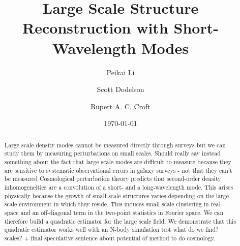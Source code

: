 \documentclass[prd,amsmath,amssymb,floatfix,superscriptaddress,nofootinbib,twocolumn]{revtex4-1}
\newcommand{\RC}[1]{{\color{darkorange} #1}}
\begin{document}
\title{Large Scale Structure Reconstruction with Short-Wavelength Modes}
\author{\large Peikai Li}
\author{\large Scott Dodelson}
\author{\large Rupert A. C. Croft}

\date{\today}
\begin{abstract}
  \noindent Large scale density modes cannot be measured directly through surveys but we can study them by measuring perturbations on small scales.
\RC{ Should really say instead something about  the fact that large scale modes are difficult to measure
    because they are sensitive to systematic observational  errors in
    galaxy surveys - not that they can't be measured}
  Cosmological perturbation theory predicts that second-order density inhomogeneities are a convolution of a short- and a long-wavelength mode. This arises physically because the growth of small scale structures varies depending on the large scale environment in which they reside. This induces small scale clustering in real space and an off-diagonal term in the two-point statistics in Fourier space. We can therefore build a quadratic estimator for the large scale field. We demonstrate that this quadratic estimator works well with an N-body simulation test \RC{what do we find? scales? + final
    speculative sentence
    about potential of method to do cosmology}.

\end{abstract}
\maketitle
\end{document}
